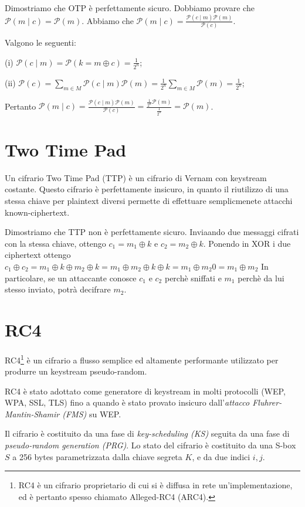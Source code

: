 Dimostriamo che OTP è perfettamente sicuro.
Dobbiamo provare che $\mathcal{P}(m \mid c)=\mathcal{P}(m)$.
Abbiamo che $\mathcal{P}(m \mid c)=\frac{\mathcal{P}(c \mid m)\mathcal{P}(m)}{\mathcal{P}(c)}$.

Valgono le seguenti:

(i) $\mathcal{P}(c \mid m)=\mathcal{P}(k=m \oplus c)=\frac{1}{2^{n}}$;

(ii) $\mathcal{P}(c)=\sum_{m \in M}\mathcal{P}(c \mid m)\mathcal{P}(m)=\frac{1}{2^{n}}\sum_{m\in M}\mathcal{P}(m)=\frac{1}{2^{n}}$;

Pertanto $\mathcal{P}(m \mid c)=\frac{\mathcal{P}(c \mid m)\mathcal{P}(m)}{\mathcal{P}(c)}=\frac{\frac{1}{2^{n}}\mathcal{P}(m)}{\frac{1}{2^{n}}}=\mathcal{P}(m)$.

\section{Two Time Pad}
Un cifrario Two Time Pad (TTP) è un cifrario di Vernam con keystream costante.
Questo cifrario è perfettamente insicuro, in quanto il riutilizzo di una stessa chiave per plaintext diversi permette di effettuare semplicmenete attacchi known-ciphertext.

Dimostriamo che TTP non è perfettamente sicuro.
Inviaando due messaggi cifrati con la stessa chiave, ottengo
$c_{1}=m_{1} \oplus k$ e $c_{2}=m_{2} \oplus k$. Ponendo in XOR i due ciphertext ottengo
$c_{1} \oplus c_{2} =
m_{1} \oplus k \oplus m_{2} \oplus k =
m_{1} \oplus m_{2} \oplus k \oplus k =
m_{1} \oplus m_{2} 0 =
m_{1} \oplus m_{2}$
In particolare, se un attaccante conosce $c_{1}$ e $c_{2}$ perchè sniffati e $m_{1}$ perchè da lui stesso inviato, potrà decifrare $m_{2}$.

\section{RC4}
RC4\footnote{RC4 è un cifrario proprietario di cui si è diffusa in rete un'implementazione, ed è pertanto spesso chiamato Alleged-RC4 (ARC4).} è un cifrario a flusso semplice ed altamente performante utilizzato per produrre un keystream pseudo-random.

RC4 è stato adottato come generatore di keystream in molti protocolli (WEP, WPA, SSL, TLS) fino a quando è stato provato insicuro dall'\textit{attacco Fluhrer-Mantin-Shamir (FMS)} su WEP.

Il cifrario è costituito da una fase di \textit{key-scheduling (KS)} seguita da una fase di \textit{pseudo-random generation (PRG)}. Lo stato del cifrario è costituito da una S-box $S$ a 256 bytes parametrizzata dalla chiave segreta $K$, e da due indici $i,j$.

